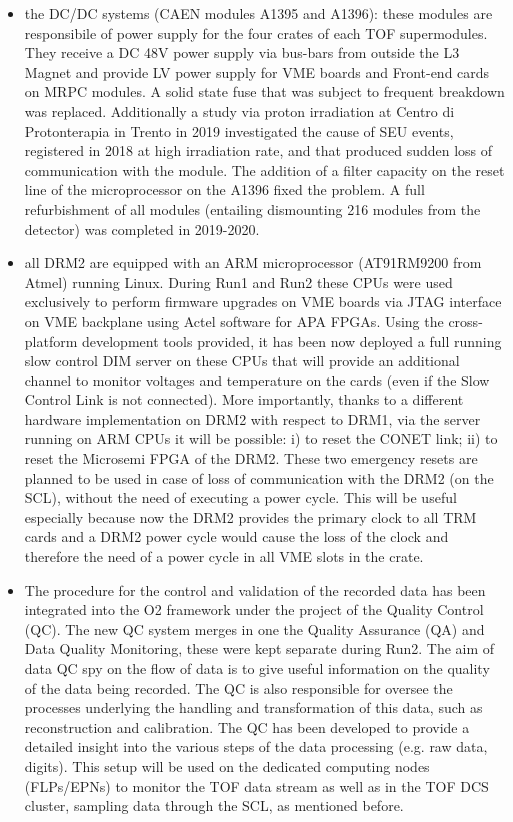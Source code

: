 \begin{itemize}
\item the DC/DC systems (CAEN modules A1395 and A1396): these modules are responsibile of power supply for the four crates of each TOF supermodules. They receive a DC 48V power supply via bus-bars from outside the L3 Magnet and provide LV power supply for VME boards and Front-end cards on MRPC modules. A solid state fuse that was subject to frequent breakdown was replaced. Additionally a study via proton irradiation at Centro di Protonterapia in Trento in 2019 investigated the cause of SEU events, registered in 2018 at high irradiation rate, and that produced sudden loss of communication with the module. The addition of a filter capacity on the reset line of the microprocessor on the A1396 fixed the problem. A full refurbishment of all modules (entailing dismounting 216 modules from the detector) was completed in 2019-2020.
\item all DRM2 are equipped with an ARM microprocessor (AT91RM9200 from Atmel) running Linux. During Run1 and Run2 these CPUs were used exclusively to perform firmware upgrades on VME boards via JTAG interface on VME backplane using Actel software for APA FPGAs. Using the cross-platform development tools provided, it has been now deployed a full running  slow control DIM server on these CPUs that will provide an additional channel to monitor voltages and temperature on the cards (even if the Slow Control Link is not connected). More importantly, thanks to a different hardware implementation on DRM2 with respect to DRM1, via the server running on ARM CPUs it will be possible: i) to reset the CONET link; ii) to reset the Microsemi FPGA of the DRM2. These two emergency resets are planned to be used in case of loss of communication with the DRM2 (on the SCL), without the need of executing a power cycle. This will be useful especially because now the DRM2 provides the primary clock to all TRM cards and a DRM2 power cycle would cause the loss of the clock and therefore the need of a power cycle in all VME slots in the crate.
\item The procedure for the control and validation of the recorded data has been integrated into the O2 framework under the project of the Quality Control (QC).
The new QC system merges in one the Quality Assurance (QA) and Data Quality Monitoring, these were kept separate during Run2. The aim of data QC spy on the flow of data is to give useful information on the quality of the data being recorded.
The QC is also responsible for oversee the processes underlying the handling and transformation of this data, such as reconstruction and calibration. The QC has been developed to provide a detailed insight into the various steps of the data processing (e.g. raw data, digits). This setup will be used on the dedicated computing nodes (FLPs/EPNs) to monitor the TOF data stream as well as in the TOF DCS cluster, sampling data through the SCL, as mentioned before.

\end{itemize}

